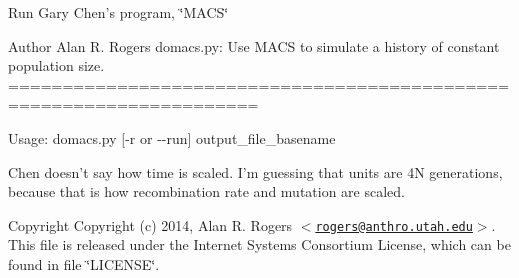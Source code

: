 \-Run \-Gary \-Chen's program, \char`\"{}\-M\-A\-C\-S\char`\"{}

\label{domacs_8py_domacs}%
\hypertarget{domacs_8py_domacs}{}%
 \begin{DoxyAuthor}{\-Author}
\-Alan \-R. \-Rogers domacs.\-py\-: \-Use \-M\-A\-C\-S to simulate a history of constant population size. =====================================================================
\end{DoxyAuthor}
\-Usage\-: domacs.\-py \mbox{[}-\/r or -\/-\/run\mbox{]} output\-\_\-file\-\_\-basename

\-Chen doesn't say how time is scaled. \-I'm guessing that units are 4\-N generations, because that is how recombination rate and mutation are scaled.

\begin{DoxyCopyright}{\-Copyright}
\-Copyright (c) 2014, \-Alan \-R. \-Rogers $<$\href{mailto:rogers@anthro.utah.edu}{\tt rogers@anthro.\-utah.\-edu}$>$. \-This file is released under the \-Internet \-Systems \-Consortium \-License, which can be found in file \char`\"{}\-L\-I\-C\-E\-N\-S\-E\char`\"{}. 
\end{DoxyCopyright}
